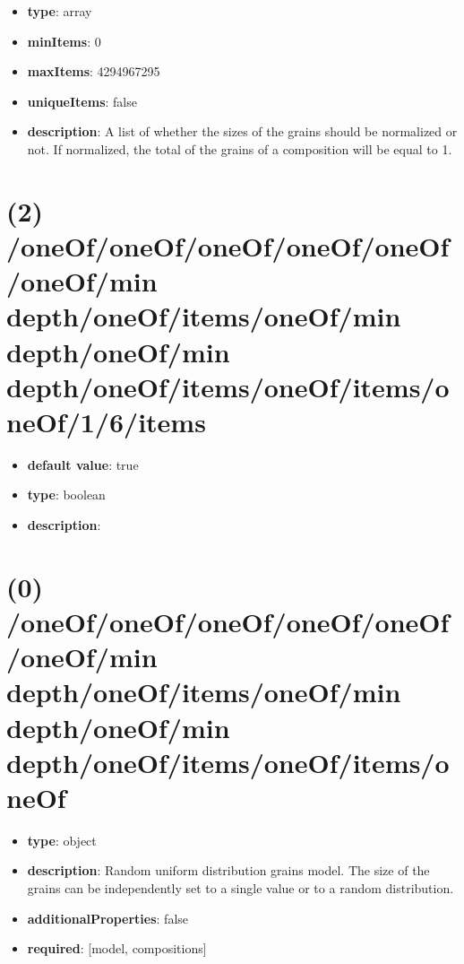 \begin{itemize}[leftmargin=1em]\item {\bf type}: array
\item {\bf minItems}: 0
\item {\bf maxItems}: 4294967295
\item {\bf uniqueItems}: false
\item {\bf description}: A list of whether the sizes of the grains should be normalized or not. If normalized, the total of the grains of a composition will be equal to 1.
\end{itemize}\section{(2) /oneOf/oneOf/oneOf/oneOf/oneOf/oneOf/min depth/oneOf/items/oneOf/min depth/oneOf/min depth/oneOf/items/oneOf/items/oneOf/1/6/items}
\begin{itemize}[leftmargin=2em]\item {\bf default value}: true
\item {\bf type}: boolean
\item {\bf description}: 
\end{itemize}\section{(0) /oneOf/oneOf/oneOf/oneOf/oneOf/oneOf/min depth/oneOf/items/oneOf/min depth/oneOf/min depth/oneOf/items/oneOf/items/oneOf}
\begin{itemize}[leftmargin=0em]\item {\bf type}: object
\item {\bf description}: Random uniform distribution grains model. The size of the grains can be independently set to a single value or to a random distribution.
\item {\bf additionalProperties}: false
\item {\bf required}: [model, compositions]\end{itemize}
